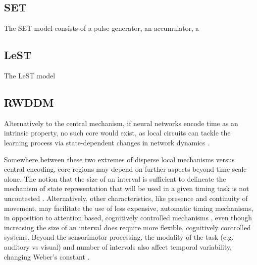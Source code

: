     \subsection{SET}
        The SET model consists of a pulse generator, an accumulator, a 
        
    \subsection{LeST}
        The LeST model 
    
    \subsection{RWDDM}
    
            Alternatively to the central mechanism, if neural networks encode time as an intrinsic property, no such core would exist, as local circuits can tackle the learning process via state-dependent changes in network dynamics \cite{mauk2004neural, paton2018neural, buonomano1995temporal, motanis2018short}. 
        
        Somewhere between these two extremes of disperse local mechanisms versus central encoding, core regions may depend on further aspects beyond time scale alone. The notion that the size of an interval is sufficient to delineate the mechanism of state representation that will be used in a given timing task is not uncontested \cite{van20168}. Alternatively, other characteristics, like presence and continuity of movement, may facilitate the use of less expensive, automatic timing mechanisms, in opposition to attention based, cognitively controlled mechanisms \cite{lewis2003distinct}, even though increasing the size of an interval does require more flexible, cognitively controlled systems. Beyond the sensorimotor processing, the modality of the task (e.g. auditory vs visual) and number of intervals also affect temporal variability, changing Weber's constant \cite{merchant2008we}.
